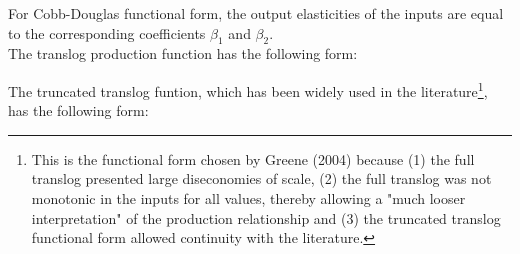 \documentclass[12pt,a4paper]{article}\usepackage[]{graphicx}\usepackage[]{color}
\begin{document}
For Cobb-Douglas functional form, the output elasticities of the inputs are equal to the corresponding coefficients $\beta_1$ and $\beta_2$. \\

The translog production function has the following form: 

The truncated translog funtion, which has been widely used in the literature\footnote{This is the functional form chosen by Greene (2004) because (1) the full translog presented large diseconomies of scale, (2) the full translog was not monotonic in the inputs for all values, thereby allowing a "much looser interpretation" of the production relationship and (3) the truncated translog functional form allowed continuity with the literature.}, has the following form:
\end{document}
